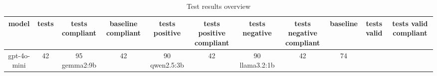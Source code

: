 
  \begin{table}[h!]
  \centering
  \begin{tabular}{|c|c|c|c|c|c|c|c|c|c|c|}
  \hline
  model & tests & tests compliant & baseline compliant & tests positive & tests positive compliant & tests negative & tests negative compliant & baseline & tests valid & tests valid compliant \\
  \hline
  gpt-4o-mini & 42 & 95%
\hline
gemma2:9b & 42 & 90%
\hline
qwen2.5:3b & 42 & 90%
\hline
llama3.2:1b & 42 & 74%
  \end{tabular}
  \caption{Test results overview}
  
  \end{table}
  